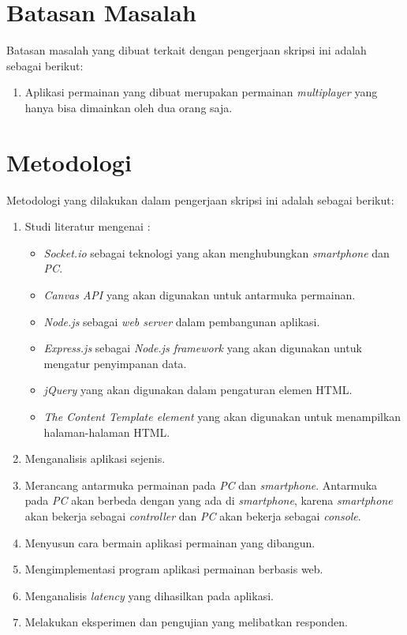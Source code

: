 \section{Batasan Masalah}
\label{sec:batasan}

Batasan masalah yang dibuat terkait dengan pengerjaan skripsi ini adalah sebagai berikut:

\begin{enumerate}
	\item Aplikasi permainan yang dibuat merupakan permainan \textit{multiplayer} yang hanya bisa dimainkan oleh dua orang saja.
\end{enumerate}


\section{Metodologi}
\label{sec:metlit}
Metodologi yang dilakukan dalam pengerjaan skripsi ini adalah sebagai berikut:

\begin{enumerate}
	\item Studi literatur mengenai :
		\begin{itemize}
			\item \textit{Socket.io} sebagai teknologi yang akan menghubungkan \textit{smartphone} dan \textit{PC}.
			\item \textit{Canvas API} yang akan digunakan untuk antarmuka permainan.
			\item \textit{Node.js} sebagai \textit{web server} dalam pembangunan aplikasi. 	
			\item \textit{Express.js} sebagai \textit{Node.js framework} yang akan digunakan untuk mengatur penyimpanan data.
			\item \textit{jQuery} yang akan digunakan dalam pengaturan elemen HTML.
			\item \textit{The Content Template element} yang akan digunakan untuk menampilkan halaman-halaman HTML.
		\end{itemize}
	\item Menganalisis aplikasi sejenis.
	\item Merancang antarmuka permainan pada \textit{PC} dan \textit{smartphone}. Antarmuka pada \textit{PC} akan berbeda dengan yang ada di \textit{smartphone}, karena \textit{smartphone} akan bekerja sebagai \textit{controller} dan \textit{PC} akan bekerja sebagai \textit{console}.
	\item Menyusun cara bermain aplikasi permainan yang dibangun.
	\item Mengimplementasi program aplikasi permainan berbasis web.
	\item Menganalisis \textit{latency} yang dihasilkan pada aplikasi.
	\item Melakukan eksperimen dan pengujian yang melibatkan responden.
\end{enumerate}

